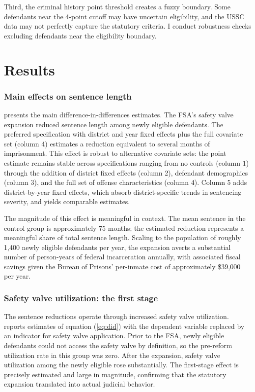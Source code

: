 \documentclass[12pt]{article}
\begin{document}
Third, the criminal history point threshold creates a fuzzy boundary. Some defendants near the 4-point cutoff may have uncertain eligibility, and the USSC data may not perfectly capture the statutory criteria. I conduct robustness checks excluding defendants near the eligibility boundary.


\section{Results}

\subsubsection*{Main effects on sentence length}
 presents the main difference-in-differences estimates. The FSA's safety valve expansion reduced sentence length among newly eligible defendants. The preferred specification with district and year fixed effects plus the full covariate set (column 4) estimates a reduction equivalent to several months of imprisonment. This effect is robust to alternative covariate sets: the point estimate remains stable across specifications ranging from no controls (column 1) through the addition of district fixed effects (column 2), defendant demographics (column 3), and the full set of offense characteristics (column 4). Column 5 adds district-by-year fixed effects, which absorb district-specific trends in sentencing severity, and yields comparable estimates.

The magnitude of this effect is meaningful in context. The mean sentence in the control group is approximately 75 months; the estimated reduction represents a meaningful share of total sentence length. Scaling to the population of roughly 1,400 newly eligible defendants per year, the expansion averts a substantial number of person-years of federal incarceration annually, with associated fiscal savings given the Bureau of Prisons' per-inmate cost of approximately \$39,000 per year.



\subsubsection*{Safety valve utilization: the first stage}
The sentence reductions operate through increased safety valve utilization.  reports estimates of equation (\ref{eq:did}) with the dependent variable replaced by an indicator for safety valve application. Prior to the FSA, newly eligible defendants could not access the safety valve by definition, so the pre-reform utilization rate in this group was zero. After the expansion, safety valve utilization among the newly eligible rose substantially. The first-stage effect is precisely estimated and large in magnitude, confirming that the statutory expansion translated into actual judicial behavior.
\end{document}
